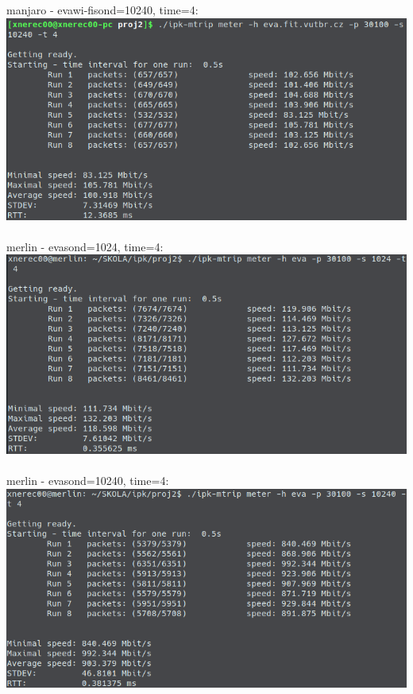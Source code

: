 \documentclass[a4paper, 11pt]{article}
\begin{document}
\newpage
\noindent manjaro - eva\qquad wi-fi\qquad sond=10240, time=4:\\
\includegraphics[scale=0.5]{pic/loc8.png}\\\\
\noindent merlin - eva\qquad sond=1024, time=4:\\
\includegraphics[scale=0.5]{pic/merlin1.png}\\\\
\noindent merlin - eva\qquad sond=10240, time=4:\\
\includegraphics[scale=0.5]{pic/merlin2.png}\\\\
\end{document}
